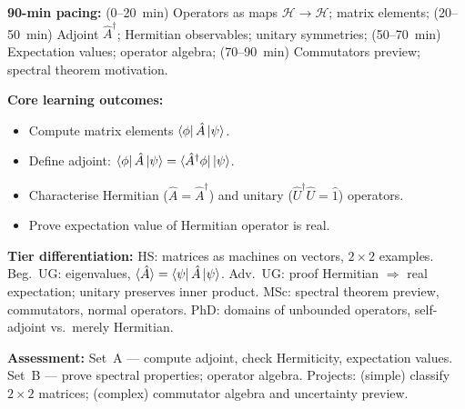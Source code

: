 \documentclass[11pt,a4paper]{article}
\begin{document}
\medskip
\begin{tcolorbox}[modulebox, title={Module~I.2 / L03: Linear Operators: Adjoint, Hermitian \& Unitary}]
\textbf{90-min pacing:} (0--20~min) Operators as maps $\mathcal{H}\to\mathcal{H}$; matrix elements;
(20--50~min) Adjoint $\hat{A}^\dagger$; Hermitian observables; unitary symmetries;
(50--70~min) Expectation values; operator algebra;
(70--90~min) Commutators preview; spectral theorem motivation.

\medskip\textbf{Core learning outcomes:}
\begin{itemize}[leftmargin=1.4em,topsep=2pt,itemsep=1pt]
  \item Compute matrix elements $\bra{\phi}\hat{A}\ket{\psi}$.
  \item Define adjoint: $\bra{\phi}\hat{A}\ket{\psi}=\bra{\hat{A}^\dagger\phi}\ket{\psi}$.
  \item Characterise Hermitian ($\hat{A}=\hat{A}^\dagger$) and unitary ($\hat{U}^\dagger\hat{U}=\hat{1}$) operators.
  \item Prove expectation value of Hermitian operator is real.
\end{itemize}

\medskip\textbf{Tier differentiation:}
HS: matrices as machines on vectors, $2\times2$ examples.
Beg.\ UG: eigenvalues, $\langle\hat{A}\rangle=\bra{\psi}\hat{A}\ket{\psi}$.
Adv.\ UG: proof Hermitian $\Rightarrow$ real expectation; unitary preserves inner product.
MSc: spectral theorem preview, commutators, normal operators.
PhD: domains of unbounded operators, self-adjoint vs.\ merely Hermitian.

\medskip\textbf{Assessment:}
Set~A --- compute adjoint, check Hermiticity, expectation values.
Set~B --- prove spectral properties; operator algebra.
Projects: (simple) classify $2\times 2$ matrices; (complex) commutator algebra and uncertainty preview.
\end{tcolorbox}
\end{document}
